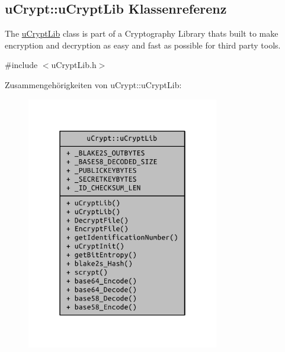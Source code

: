 \hypertarget{classuCrypt_1_1uCryptLib}{}\subsection{u\+Crypt\+:\+:u\+Crypt\+Lib Klassenreferenz}
\label{classuCrypt_1_1uCryptLib}


The \hyperlink{classuCrypt_1_1uCryptLib}{u\+Crypt\+Lib} class is part of a Cryptography Library that\textquotesingle{}s built to make encryption and decryption as easy and fast as possible for third party tools.  




{\ttfamily \#include $<$u\+Crypt\+Lib.\+h$>$}



Zusammengehörigkeiten von u\+Crypt\+:\+:u\+Crypt\+Lib\+:\nopagebreak
\begin{figure}[H]
\begin{center}
\leavevmode
\includegraphics[width=238pt]{classuCrypt_1_1uCryptLib__coll__graph}
\end{center}
\end{figure}
